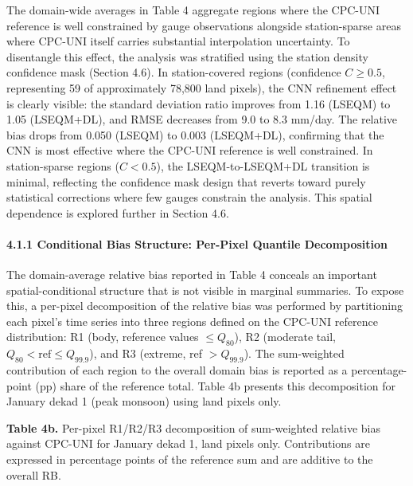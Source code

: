 \documentclass[
]{article}
\begin{document}
The domain-wide averages in Table 4 aggregate regions where the CPC-UNI
reference is well constrained by gauge observations alongside
station-sparse areas where CPC-UNI itself carries substantial
interpolation uncertainty. To disentangle this effect, the analysis was
stratified using the station density confidence mask (Section 4.6). In
station-covered regions (confidence \(C \geq 0.5\), representing 59 of
approximately 78,800 land pixels), the CNN refinement effect is clearly
visible: the standard deviation ratio improves from 1.16 (LSEQM) to 1.05
(LSEQM+DL), and RMSE decreases from 9.0 to 8.3 mm/day. The relative bias
drops from 0.050 (LSEQM) to 0.003 (LSEQM+DL), confirming that the CNN is
most effective where the CPC-UNI reference is well constrained. In
station-sparse regions (\(C < 0.5\)), the LSEQM-to-LSEQM+DL transition
is minimal, reflecting the confidence mask design that reverts toward
purely statistical corrections where few gauges constrain the analysis.
This spatial dependence is explored further in Section 4.6.

\paragraph{4.1.1 Conditional Bias Structure: Per-Pixel Quantile
Decomposition}\label{conditional-bias-structure-per-pixel-quantile-decomposition}

The domain-average relative bias reported in Table 4 conceals an
important spatial-conditional structure that is not visible in marginal
summaries. To expose this, a per-pixel decomposition of the relative
bias was performed by partitioning each pixel's time series into three
regions defined on the CPC-UNI reference distribution: R1 (body,
reference values \(\leq Q_{80}\)), R2 (moderate tail,
\(Q_{80} < \text{ref} \leq Q_{99.9}\)), and R3 (extreme, ref
\(> Q_{99.9}\)). The sum-weighted contribution of each region to the
overall domain bias is reported as a percentage-point (pp) share of the
reference total. Table 4b presents this decomposition for January dekad
1 (peak monsoon) using land pixels only.

\textbf{Table 4b.} Per-pixel R1/R2/R3 decomposition of sum-weighted
relative bias against CPC-UNI for January dekad 1, land pixels only.
Contributions are expressed in percentage points of the reference sum
and are additive to the overall RB.
\end{document}
